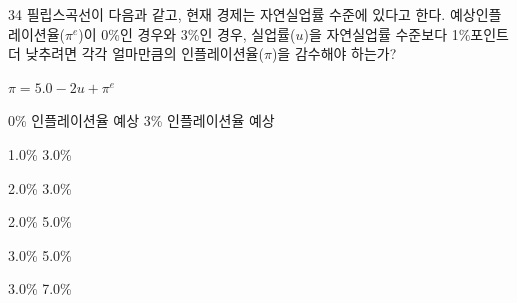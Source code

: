 \begin{question}{34}
필립스곡선이 다음과 같고, 현재 경제는 자연실업률 수준에 있다고 한다. 예상인플레이션율($\pi^{ e }$)이 0\%인 경우와 3\%인 경우, 실업률($u$)을 자연실업률 수준보다 1\%포인트 더 낮추려면 각각 얼마만큼의 인플레이션율($\pi$)을 감수해야 하는가?
\begin{center}$\pi = 5.0 - 2u + \pi^{e}$\end{center}
\begin{choices}
  \item[] \hspace*{3.5em}0\% 인플레이션율 예상 \hspace{1.5em} 3\% 인플레이션율 예상
  \item \hspace*{6em}1.0\% \hspace*{8em} 3.0\%
  \item \hspace*{6em}2.0\% \hspace*{8em} 3.0\%
  \item \hspace*{6em}2.0\% \hspace*{8em} 5.0\%
  \item \hspace*{6em}3.0\% \hspace*{8em} 5.0\%
  \item \hspace*{6em}3.0\% \hspace*{8em} 7.0\%
\end{choices}
\end{question}
